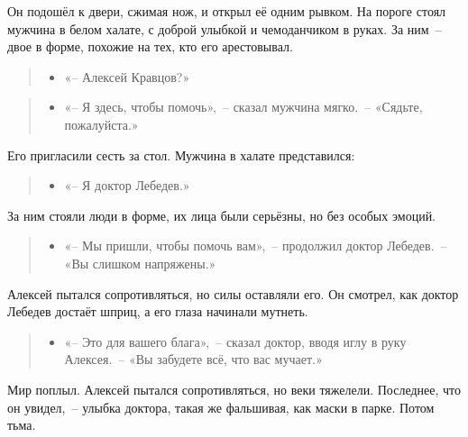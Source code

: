 \documentclass[12pt,a4paper]{book}
\newenvironment{dialogue}{\begin{quote}\itshape\begin{itemize}\item[]}{\end{itemize}\end{quote}}
\begin{document}
Он подошёл к двери, сжимая нож, и открыл её одним рывком. На пороге стоял мужчина в белом халате, с доброй улыбкой и чемоданчиком в руках. За ним~-- двое в форме, похожие на тех, кто его арестовывал.

\begin{dialogue}
«-- Алексей Кравцов?»
\end{dialogue}

\begin{dialogue}
«-- Я здесь, чтобы помочь»,~-- сказал мужчина мягко.~-- «Сядьте, пожалуйста.»
\end{dialogue}

Его пригласили сесть за стол. Мужчина в халате представился:

\begin{dialogue}
«-- Я доктор Лебедев.»
\end{dialogue}

За ним стояли люди в форме, их лица были серьёзны, но без особых эмоций.

\begin{dialogue}
«-- Мы пришли, чтобы помочь вам»,~-- продолжил доктор Лебедев.~-- «Вы слишком напряжены.»
\end{dialogue}

Алексей пытался сопротивляться, но силы оставляли его. Он смотрел, как доктор Лебедев достаёт шприц, а его глаза начинали мутнеть.

\begin{dialogue}
«-- Это для вашего блага»,~-- сказал доктор, вводя иглу в руку Алексея.~-- «Вы забудете всё, что вас мучает.»
\end{dialogue}

Мир поплыл. Алексей пытался сопротивляться, но веки тяжелели. Последнее, что он увидел,~-- улыбка доктора, такая же фальшивая, как маски в парке. Потом тьма.
\end{document}
